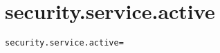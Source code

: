 \section{security.service.active}
\label{configuration:SecurityServiceActive}
\ClearAPI
\TODO
\begin{lstlisting}[style=Props,caption={Usage example for \textit{security.service.active}}]
security.service.active=
\end{lstlisting}